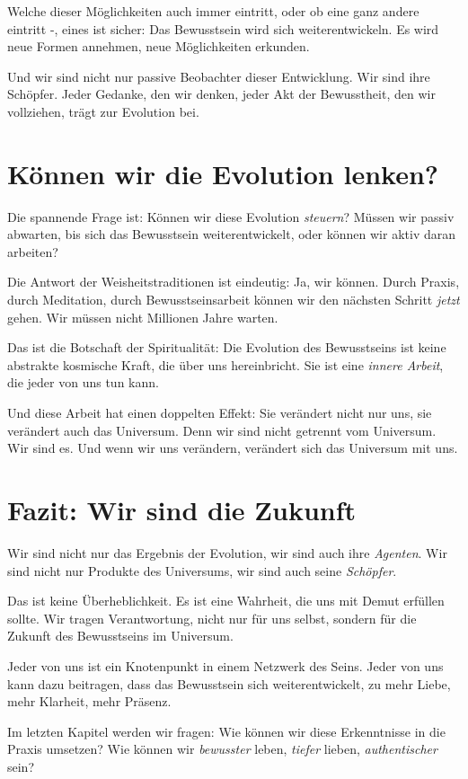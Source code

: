 Welche dieser Möglichkeiten auch immer eintritt, oder ob eine ganz andere eintritt -, eines ist sicher: Das Bewusstsein wird sich weiterentwickeln. Es wird neue Formen annehmen, neue Möglichkeiten erkunden.

Und wir sind nicht nur passive Beobachter dieser Entwicklung. Wir sind ihre Schöpfer. Jeder Gedanke, den wir denken, jeder Akt der Bewusstheit, den wir vollziehen, trägt zur Evolution bei.

\section{Können wir die Evolution lenken?}

Die spannende Frage ist: Können wir diese Evolution \emph{steuern}? Müssen wir passiv abwarten, bis sich das Bewusstsein weiterentwickelt, oder können wir aktiv daran arbeiten?

Die Antwort der Weisheitstraditionen ist eindeutig: Ja, wir können. Durch Praxis, durch Meditation, durch Bewusstseinsarbeit können wir den nächsten Schritt \emph{jetzt} gehen. Wir müssen nicht Millionen Jahre warten.

Das ist die Botschaft der Spiritualität: Die Evolution des Bewusstseins ist keine abstrakte kosmische Kraft, die über uns hereinbricht. Sie ist eine \emph{innere Arbeit}, die jeder von uns tun kann.

Und diese Arbeit hat einen doppelten Effekt: Sie verändert nicht nur uns, sie verändert auch das Universum. Denn wir sind nicht getrennt vom Universum. Wir sind es. Und wenn wir uns verändern, verändert sich das Universum mit uns.

\section{Fazit: Wir sind die Zukunft}

Wir sind nicht nur das Ergebnis der Evolution, wir sind auch ihre \emph{Agenten}. Wir sind nicht nur Produkte des Universums, wir sind auch seine \emph{Schöpfer}.

Das ist keine Überheblichkeit. Es ist eine Wahrheit, die uns mit Demut erfüllen sollte. Wir tragen Verantwortung, nicht nur für uns selbst, sondern für die Zukunft des Bewusstseins im Universum.

Jeder von uns ist ein Knotenpunkt in einem Netzwerk des Seins. Jeder von uns kann dazu beitragen, dass das Bewusstsein sich weiterentwickelt, zu mehr Liebe, mehr Klarheit, mehr Präsenz.

Im letzten Kapitel werden wir fragen: Wie können wir diese Erkenntnisse in die Praxis umsetzen? Wie können wir \emph{bewusster} leben, \emph{tiefer} lieben, \emph{authentischer} sein?
